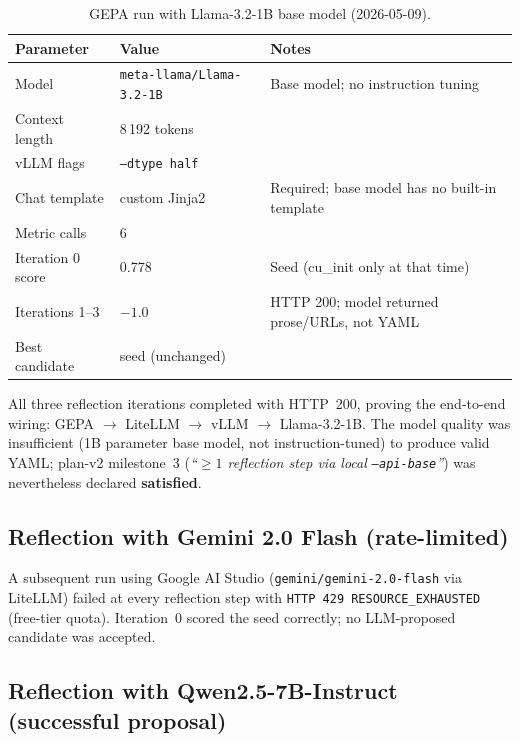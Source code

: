 \documentclass[11pt,a4paper]{article}
\begin{document}
\begin{table}[H]
\centering
\caption{GEPA run with Llama-3.2-1B base model (2026-05-09).}
\label{tab:llama}
\begin{tabular}{lll}
\toprule
\textbf{Parameter} & \textbf{Value} & \textbf{Notes} \\
\midrule
Model            & \texttt{meta-llama/Llama-3.2-1B} & Base model; no instruction tuning \\
Context length   & 8\,192 tokens  & \\
vLLM flags       & \texttt{--dtype half}             & \\
Chat template    & custom Jinja2  & Required; base model has no built-in template \\
Metric calls     & 6              & \\
\midrule
Iteration 0 score & 0.778         & Seed (cu\_init only at that time) \\
Iterations 1--3   & $-1.0$        & HTTP 200; model returned prose/URLs, not YAML \\
Best candidate   & seed (unchanged) & \\
\bottomrule
\end{tabular}
\end{table}

All three reflection iterations completed with HTTP~200, proving the
end-to-end wiring: GEPA $\to$ LiteLLM $\to$ vLLM $\to$ Llama-3.2-1B.
The model quality was insufficient (1B parameter base model, not
instruction-tuned) to produce valid YAML; plan-v2 milestone~3
(\emph{``$\ge1$ reflection step via local \texttt{--api-base}''}) was
nevertheless declared \textbf{satisfied}.

\subsection{Reflection with Gemini 2.0 Flash (rate-limited)}

A subsequent run using Google AI Studio (\texttt{gemini/gemini-2.0-flash}
via LiteLLM) failed at every reflection step with \texttt{HTTP 429
RESOURCE\_EXHAUSTED} (free-tier quota).
Iteration~0 scored the seed correctly; no LLM-proposed candidate was
accepted.

\subsection{Reflection with Qwen2.5-7B-Instruct (successful proposal)}
\label{sec:qwen}
\end{document}
